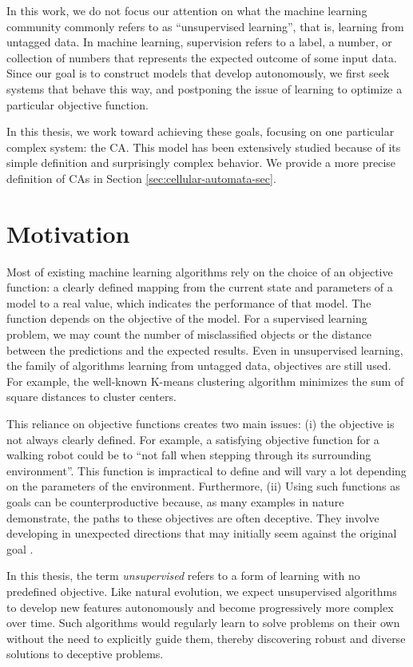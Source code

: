 In this work, we do not focus our attention on what the machine learning
community commonly refers to as ``unsupervised learning'', that is, learning
from untagged data. In machine learning, supervision refers to a label, a number,
or collection of numbers that represents the expected outcome of some input
data. Since our goal is to construct models that develop autonomously, we first
seek systems that behave this way, and postponing the issue of learning to
optimize a particular objective function.

In this thesis, we work toward achieving these goals, focusing on one particular
complex system: the \acl{CA}. This model has been extensively studied because of its simple definition and surprisingly complex behavior. We provide a
more precise definition of \aclp{CA} in Section \ref{sec:cellular-automata-sec}.


\section{Motivation}

Most of existing machine learning algorithms rely on the choice of an objective
function: a clearly defined mapping from the current state and parameters of a
model to a real value, which indicates the performance of that model. The
function depends on the objective of the model. For a supervised learning
problem, we may count the number of misclassified objects or the distance between
the predictions and the expected results. Even in unsupervised learning, the family of
algorithms learning from untagged data, objectives are still used. For
example, the well-known K-means clustering algorithm minimizes the sum of square
distances to cluster centers.

This reliance on objective functions creates two main issues: (i) the objective
is not always clearly defined. For example, a satisfying objective function for
a walking robot could be to ``not fall when stepping through its surrounding
environment''. This function is impractical to define and will vary a lot
depending on the parameters of the environment. Furthermore, (ii) Using such
functions as goals can be counterproductive because, as many examples in nature
demonstrate, the paths to these objectives are often deceptive. They involve
developing in unexpected directions that may initially seem against the original
goal \parencite{stanleyWhyGreatnessCannot2015}.

In this thesis, the term \emph{unsupervised} refers to a form of learning with
no predefined objective. Like natural evolution, we expect unsupervised
algorithms to develop new features autonomously and become progressively more
complex over time. Such algorithms would regularly learn to solve problems on
their own without the need to explicitly guide them, thereby discovering robust
and diverse solutions to deceptive problems.


